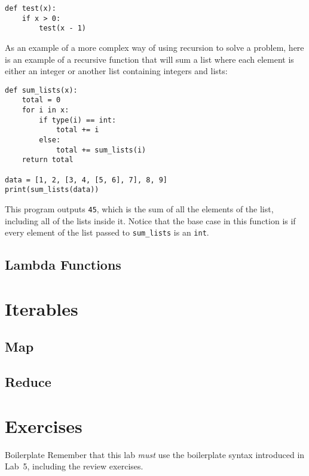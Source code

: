 \documentclass[11pt]{cselabheader}
\begin{document}
\begin{lstlisting}[style=python]
def test(x):
    if x > 0:
        test(x - 1)
\end{lstlisting}

As an example of a more complex way of using recursion to solve a problem, here is an example of a recursive function that will sum a list where each element is either an integer or another list containing integers and lists:

\begin{lstlisting}[style=python]
def sum_lists(x):
    total = 0
    for i in x:
        if type(i) == int:
            total += i
        else:
            total += sum_lists(i)
    return total

data = [1, 2, [3, 4, [5, 6], 7], 8, 9]
print(sum_lists(data))
\end{lstlisting}

This program outputs \lstinline{45}, which is the sum of all the elements of the list, including all of the lists inside it. Notice that the base case in this function is if every element of the list passed to \lstinline{sum_lists} is an \lstinline{int}.

\subsection{Lambda Functions}
\label{subsec:lambda}


\section{Iterables}
\label{subsec:iter}

\subsection{Map}
\label{subsec:map}


\subsection{Reduce}
\label{subsec:reduce}






\pagebreak


\section{Exercises}
\label{sec:ex}

\begin{warningbox}{Boilerplate}
  Remember that this lab \emph{must} use the
  boilerplate syntax introduced in Lab~5, including the review exercises.
\end{warningbox}
\end{document}
